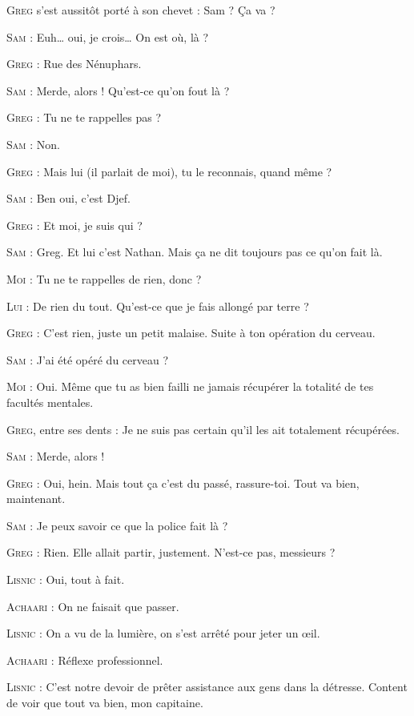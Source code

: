 \begin{dialogue}

\textsc{Greg} s’est aussitôt porté à son chevet : Sam ? Ça va ?

\textsc{Sam} : Euh… oui, je crois… On est où, là ?

\textsc{Greg} : Rue des Nénuphars.

\textsc{Sam} : Merde, alors ! Qu’est-ce qu’on fout là ?

\textsc{Greg} : Tu ne te rappelles pas ?

\textsc{Sam} : Non.

\textsc{Greg} : Mais lui (il parlait de moi), tu le reconnais, quand même ?

\textsc{Sam} : Ben oui, c’est Djef.

\textsc{Greg} : Et moi, je suis qui ?

\textsc{Sam} : Greg. Et lui c’est Nathan. Mais ça ne dit toujours pas ce qu’on fait là.

\textsc{Moi} : Tu ne te rappelles de rien, donc ?

\textsc{Lui} : De rien du tout. Qu’est-ce que je fais allongé par terre ?

\textsc{Greg} : C’est rien, juste un petit malaise. Suite à ton opération du cerveau.

\textsc{Sam} : J’ai été opéré du cerveau ?

\textsc{Moi} : Oui. Même que tu as bien failli ne jamais récupérer la totalité de tes facultés mentales.

\textsc{Greg}, entre ses dents : Je ne suis pas certain qu’il les ait totalement récupérées.

\textsc{Sam} : Merde, alors !

\textsc{Greg} : Oui, hein. Mais tout ça c’est du passé, rassure-toi. Tout va bien, maintenant.

\textsc{Sam} : Je peux savoir ce que la police fait là ?

\textsc{Greg} : Rien. Elle allait partir, justement. N’est-ce pas, messieurs ?

\textsc{Lisnic} : Oui, tout à fait.

\textsc{Achaari} : On ne faisait que passer.

\textsc{Lisnic} : On a vu de la lumière, on s’est arrêté pour jeter un œil.

\textsc{Achaari} : Réflexe professionnel.

\textsc{Lisnic} : C’est notre devoir de prêter assistance aux gens dans la détresse. Content de voir que tout va bien, mon capitaine.


\end{dialogue}
